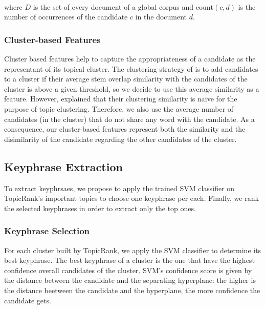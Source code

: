       \vspace{-2.5em}

      ~\\where $D$ is the set of every document of a global corpus and
      $\text{count}(c, d)$ is the number of occurrences of the candidate $c$ in
      the document $d$.

    \subsubsection{Cluster-based Features}
    \label{subsubsec:topically_dependent_features}
      Cluster based features help to capture the appropriateness of a candidate
      as the representant of its topical cluster. The clustering strategy of
       is to add candidates to a cluster if their
      average stem overlap similarity with the candidates of the cluster is
      above a given threshold, so we decide to use this average similarity as a
      feature. However,  explained that their
      clustering similarity is naive for the purpose of topic clustering.
      Therefore, we also use the average number of candidates (in the cluster)
      that do not share any word with the candidate. As a consequence, our
      cluster-based features represent both the similarity and the disimilarity
      of the candidate regarding the other candidates of the cluster.

  \subsection{Keyphrase Extraction}
  \label{subsec:keyphrase_extraction}
    To extract keyphrsaes, we propose to apply the trained SVM classifier on
    TopicRank's important topics to choose one keyphrase per each. Finally, we
    rank the selected keyphrases in order to extract only the top ones.

    \subsubsection{Keyphrase Selection}
    \label{subsubsec:keyphrase_selection}
      For each cluster built by TopicRank, we apply the SVM classifier to
      determine its best keyphrase. The best keyphrase of a cluster is the one
      that have the highest confidence overall candidates of the cluster. SVM's
      confidence score is given by the distance between the candidate and the
      separating hyperplane: the higher is the distance beetween the candidate
      and the hyperplane, the more confidence the candidate gets.

